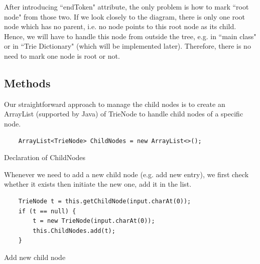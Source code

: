 \documentclass[12pt]{article}
\begin{document}
After introducing ``endToken" attribute, the only problem is how to mark ``root node" from those two. If we look closely to the diagram, there is only one root node which has no parent, i.e. no node points to this root node as its child. Hence, we will have to handle this node from outside the tree, e.g. in ``main class" or in 
``Trie Dictionary" (which will be implemented later). Therefore, there is no need to mark one node is root or not.

\subsection{Methods}
Our straightforward approach to manage the child nodes is to create an ArrayList (supported by Java) of TrieNode to handle child nodes of a specific node.
\begin{listing}[ht]
	\begin{verbatim}
	ArrayList<TrieNode> ChildNodes = new ArrayList<>();
	\end{verbatim}
	\caption{Declaration of ChildNodes}
\end{listing}

Whenever we need to add a new child node (e.g. add new entry), we first check whether it exists then initiate the new one, add it in the list.


\begin{listing}[ht]
	\begin{verbatim}
	TrieNode t = this.getChildNode(input.charAt(0));
	if (t == null) {
		t = new TrieNode(input.charAt(0));
		this.ChildNodes.add(t);
	}
	\end{verbatim}
	\caption{Add new child node}
\end{listing}
\end{document}

